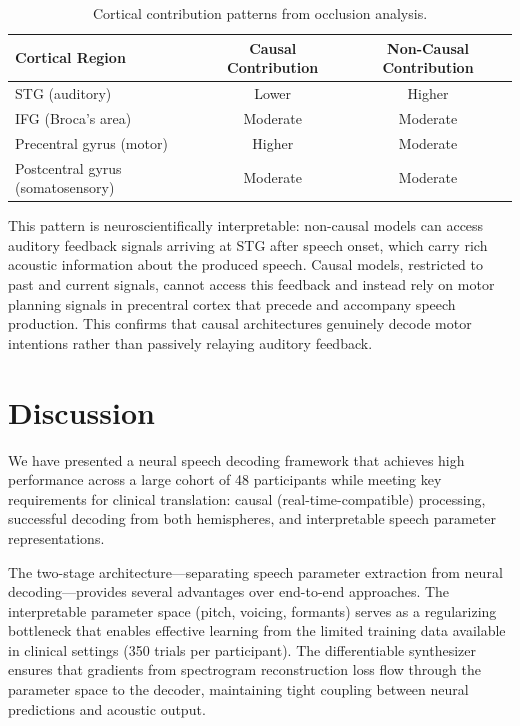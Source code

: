 \documentclass[11pt]{article}
\begin{document}
\begin{table}[htbp]
\centering
\caption{Cortical contribution patterns from occlusion analysis.}
\label{tab:occlusion}
\begin{tabular}{lcc}
\toprule
\textbf{Cortical Region} & \textbf{Causal Contribution} & \textbf{Non-Causal Contribution} \\
\midrule
STG (auditory) & Lower & Higher \\
IFG (Broca's area) & Moderate & Moderate \\
Precentral gyrus (motor) & Higher & Moderate \\
Postcentral gyrus (somatosensory) & Moderate & Moderate \\
\bottomrule
\end{tabular}
\end{table}

This pattern is neuroscientifically interpretable: non-causal models can access auditory feedback signals arriving at STG after speech onset, which carry rich acoustic information about the produced speech. Causal models, restricted to past and current signals, cannot access this feedback and instead rely on motor planning signals in precentral cortex that precede and accompany speech production. This confirms that causal architectures genuinely decode motor intentions rather than passively relaying auditory feedback.

\section{Discussion}

We have presented a neural speech decoding framework that achieves high performance across a large cohort of 48 participants while meeting key requirements for clinical translation: causal (real-time-compatible) processing, successful decoding from both hemispheres, and interpretable speech parameter representations.

The two-stage architecture---separating speech parameter extraction from neural decoding---provides several advantages over end-to-end approaches. The interpretable parameter space (pitch, voicing, formants) serves as a regularizing bottleneck that enables effective learning from the limited training data available in clinical settings (350 trials per participant). The differentiable synthesizer ensures that gradients from spectrogram reconstruction loss flow through the parameter space to the decoder, maintaining tight coupling between neural predictions and acoustic output.
\end{document}
